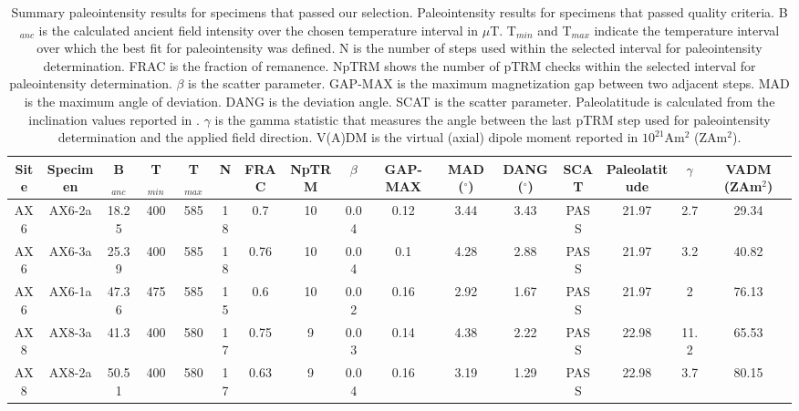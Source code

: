 \documentclass[9pt,twoside,lineno]{pnas-new}
\begin{document}
\begin{table}
\caption{\footnotesize{Summary paleointensity results for specimens that passed our selection. Paleointensity results for specimens that passed quality criteria. B$_{anc}$ is the calculated ancient field intensity over the chosen temperature interval in $\mu$T. T$_{min}$ and T$_{max}$ indicate the temperature interval over which the best fit for paleointensity was defined. N is the number of steps used within the selected interval for paleointensity determination. FRAC is the fraction of remanence. NpTRM shows the number of pTRM checks within the selected interval for paleointensity determination. $\beta$ is the scatter parameter.  GAP-MAX is the maximum magnetization gap between two adjacent steps. MAD is the maximum angle of deviation. DANG is the deviation angle. SCAT is the scatter parameter. Paleolatitude is calculated from the inclination values reported in \cite{Zhang2021b}. $\gamma$ is the gamma statistic that measures the angle between the last pTRM step used for paleointensity determination and the applied field direction. V(A)DM is the virtual (axial) dipole moment reported in $10^{21}$Am$^2$ (ZAm$^2$). }}
\centering
\begin{tabular}{cccccccccccccccc}
\hline
Site & Specimen & B$_{anc}$ & T$_{min}$ & T$_{max}$ & N    & FRAC & NpTRM & $\beta$ & GAP-MAX & MAD ($^\circ$) & DANG ($^\circ$) & SCAT & Paleolatitude & $\gamma$ & VADM (ZAm$^2$) \\
\hline
AX6  & AX6-2a   & 18.25     & 400       & 585       & 18 & 0.7  & 10    & 0.04    & 0.12    & 3.44           & 3.43            & PASS & 21.97         & 2.7      & 29.34         \\
AX6  & AX6-3a   & 25.39     & 400       & 585       & 18 & 0.76 & 10    & 0.04    & 0.1     & 4.28           & 2.88            & PASS & 21.97         & 3.2      & 40.82         \\
AX6  & AX6-1a   & 47.36     & 475       & 585       & 15 & 0.6  & 10    & 0.02    & 0.16    & 2.92           & 1.67            & PASS & 21.97         & 2        & 76.13         \\
AX8  & AX8-3a   & 41.3      & 400       & 580       & 17 & 0.75 & 9     & 0.03    & 0.14    & 4.38           & 2.22            & PASS & 22.98         & 11.2     & 65.53         \\
AX8  & AX8-2a   & 50.51     & 400       & 580       & 17 & 0.63 & 9     & 0.04    & 0.16    & 3.19           & 1.29            & PASS & 22.98         & 3.7      & 80.15         \\

\end{tabular}
\end{table}
\end{document}
